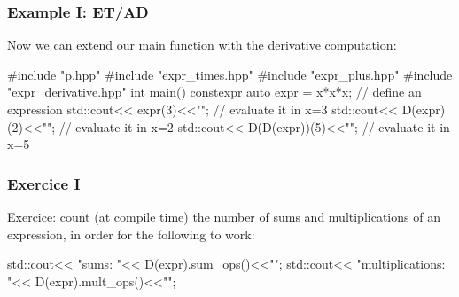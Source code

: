 \documentclass[aspectratio=43]{beamer}
\begin{document}

\begin{frame}[fragile]\frametitle{Example I: ET/AD}
  Now we can extend our main function with the derivative computation:
  \begin{Cpplisting}[: main]{}
#include "p.hpp"
#include "expr_times.hpp"
#include "expr_plus.hpp"
#include "expr_derivative.hpp"
int main(){
  constexpr auto expr = x*x*x; // define an expression
  std::cout<< expr(3)<<"\n"; // evaluate it in x=3
  std::cout<< D(expr)(2)<<"\n"; // evaluate it in x=2
  std::cout<< D(D(expr))(5)<<"\n"; // evaluate it in x=5
}
  \end{Cpplisting}
\end{frame}

\begin{frame}[fragile]\frametitle{Exercice I}
  Exercice: count (at compile time) the number of sums and multiplications of an expression,
  in order for the following to work:

  \begin{Cpplisting}[: Exercice I]{}
std::cout<< "sums: "<< D(expr).sum_ops()<<"\n";
std::cout<< "multiplications: "<< D(expr).mult_ops()<<"\n";
  \end{Cpplisting}
\end{frame}
\end{document}
